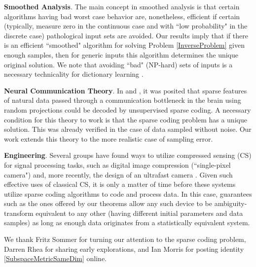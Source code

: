 \documentclass[journal, twocolumn]{IEEEtran}
\begin{document}
\textbf{Smoothed Analysis}.
The main concept in smoothed analysis \cite{Spielman04} is that certain algorithms having bad worst case behavior are, nonetheless, efficient if certain (typically, measure zero in the continuous case and with ``low probability" in the discrete case) pathological input sets are avoided. Our results imply that if there is an efficient ``smoothed" algorithm for solving Problem \ref{InverseProblem} given enough samples, then for generic inputs this algorithm determines the unique original solution. We note that avoiding ``bad" (NP-hard) sets of inputs is a necessary technicality for dictionary learning \cite{Razaviyayn15, Tillmann15}.

\textbf{Neural Communication Theory}.
In \cite{Coulter10} and \cite{Isely10}, it was posited that sparse features of natural data passed through a communication bottleneck in the brain using random projections could be decoded by unsupervised sparse coding.  A necessary condition for this theory to work is that the sparse coding problem has a unique solution.  This was already verified in the case of data sampled without noise.  Our work extends this theory to the more realistic case of sampling error.

\textbf{Engineering}.
Several groups have found ways to utilize compressed sensing (CS) for signal processing tasks, such as digital image compression \cite{Duarte08} (``single-pixel camera") and, more recently, the design of an ultrafast camera \cite{Gao14}. Given such effective uses of classical CS, it is only a matter of time before these systems utilize sparse coding algorithms to code and process data. In this case, guarantees such as the ones offered by our theorems allow any such device to be ambiguity-transform equivalent to any other (having different initial parameters and data samples) as long as enough data originates from a statistically equivalent system.



We thank Fritz Sommer for turning our attention to the sparse coding problem, Darren Rhea for sharing early explorations, and Ian Morris for posting identity \eqref{SubspaceMetricSameDim} online.

\end{document}
